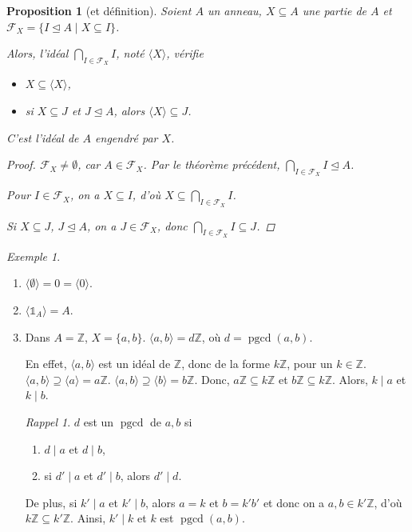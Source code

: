 \documentclass{report}
\newtheorem*{prop}{Proposition}
\theoremstyle{definition}
\theoremstyle{remark}
\newtheorem*{exem}{Exemple}
\newtheorem*{rapp}{Rappel}
\def\ZZ{\mathbb{Z}}
\def\id{\mathds{1}}
\begin{document}
	\begin{prop}[et d\'efinition]
		Soient $A$ un anneau, $X \subseteq A$ une partie de $A$ et $\mathscr{F}_X = \{I \trianglelefteq A \mid X \subseteq I\}$.

		Alors, l'id\'eal $\bigcap\limits_{I \in \mathscr{F}_X}I$, not\'e $\langle X \rangle$, v\'erifie
		\begin{itemize}
			\item $X \subseteq \langle X \rangle$,
			\item si $X \subseteq J$ et $J \trianglelefteq A$, alors $\langle X \rangle \subseteq J$.
		\end{itemize}
		C'est l'\emph{id\'eal de $A$ engendr\'e par $X$}.
		\begin{proof}
			$\mathscr{F}_X\neq\emptyset$, car $A \in \mathscr{F}_X$. Par le th\'eor\`eme pr\'ec\'edent, $\bigcap\limits_{I \in \mathscr{F}_X}I \trianglelefteq A$.

			Pour $I \in \mathscr{F}_X$, on a $X \subseteq I$, d'o\`u $X \subseteq \bigcap\limits_{I \in \mathscr{F}_X}I$.

			Si $X \subseteq J$, $J \trianglelefteq A$, on a $J \in \mathscr{F}_X$, donc $\bigcap\limits_{I \in \mathscr{F}_X}I \subseteq J$.
		\end{proof}
	\end{prop}

	\begin{exem}
		\begin{enumerate}
			\item $\langle \emptyset \rangle = 0 = \langle 0 \rangle$.
			\item $\langle \id_A \rangle = A$.
			\item Dans $A=\ZZ$, $X=\{a,b\}$. $\langle a,b \rangle = d\ZZ$, o\`u $d=\operatorname{pgcd}(a,b)$.

			En effet, $\langle a,b \rangle$ est un id\'eal de $\ZZ$, donc de la forme $k\ZZ$, pour un $k\in\ZZ$. $\langle a,b \rangle \supseteq \langle a \rangle = a\ZZ$. $\langle a,b \rangle \supseteq \langle b \rangle = b\ZZ$. Donc, $a\ZZ \subseteq k\ZZ$ et $b\ZZ \subseteq k\ZZ$. Alors, $k \mid a$ et $k \mid b$.
			\begin{rapp}
				$d$ est un $\operatorname{pgcd}$ de $a,b$ si
				\begin{enumerate}
					\item $d \mid a$ et $d \mid b$,
					\item si $d' \mid a$ et $d' \mid b$, alors $d' \mid d$.
				\end{enumerate}
			\end{rapp}

			De plus, si $k' \mid a$ et $k' \mid b$, alors $a=k$ et $b=k'b'$ et donc on a $a,b \in k'\ZZ$, d'o\`u $k\ZZ \subseteq k'\ZZ$. Ainsi, $k' \mid k$ et $k$ est $\operatorname{pgcd}(a,b)$.
		\end{enumerate}
	\end{exem}
\end{document}
